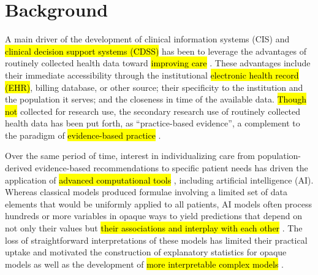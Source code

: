 \documentclass[sn-mathphys,Numbered,pdflatex]{sn-jnl}
\theoremstyle{remark}
\theoremstyle{definition}
\begin{document}

\maketitle

\pagebreak

\section{Background}\label{background}

A main driver of the development of clinical information systems (CIS)
and \hl{clinical decision support systems (CDSS)} has been to leverage
the advantages of routinely collected health data toward
\hl{improving care }\citep{Benchimol2015, Wasylewicz2019}. These
advantages include their immediate accessibility through the
institutional \hl{electronic health record (EHR)}, billing database, or
other source; their specificity to the institution and the population it
serves; and the closeness in time of the available data. \hl{Though not}
collected for research use, the secondary research use of routinely
collected health data has been put forth, as ``practice-based
evidence'', a complement to the paradigm of
\hl{evidence-based practice }\citep{Sim2001, Holmqvist2015}.

Over the same period of time, interest in individualizing care from
population-derived evidence-based recommendations to specific patient
needs has driven the application of
\hl{advanced computational tools }\citep{Rosella2022, Elhaddad2024},
including artificial intelligence (AI). Whereas classical models
produced formulae involving a limited set of data elements that would be
uniformly applied to all patients, AI models often process hundreds or
more variables in opaque ways to yield predictions that depend on not
only their values but
\hl{their associations and interplay with each other }\citep{Molnar2023}.
The loss of straightforward interpretations of these models has limited
their practical uptake and motivated the construction of explanatory
statistics for opaque models as well as the development of
\hl{more interpretable complex models }\citep{Rudin2022, Molnar2023}.
\end{document}
